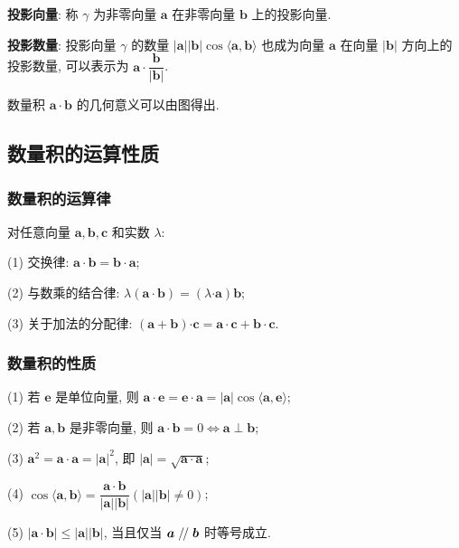 \documentclass[titlepage]{ctexart}
\renewcommand\parallel{\mathrel{/\mskip-2.5mu/}}
\begin{document}
\textbf{投影向量}: 称 $\gamma$ 为非零向量 $\boldsymbol{a}$ 在非零向量 $\boldsymbol{b}$ 上的投影向量.

\textbf{投影数量}: 投影向量 $\gamma$ 的数量 $|\boldsymbol{a}||\boldsymbol{b}|\cos \langle \boldsymbol{a}, \boldsymbol{b} \rangle$
也成为向量 $\boldsymbol{a}$ 在向量 $|\boldsymbol{b}|$ 方向上的投影数量, 可以表示为 $\boldsymbol{a \cdot} \dfrac{\boldsymbol{b}}{|\boldsymbol{b}|}$.

数量积 $\boldsymbol{a \cdot b}$ 的几何意义可以由图得出.

\subsection{数量积的运算性质}

\subsubsection{数量积的运算律}

对任意向量 $\boldsymbol{a, b, c}$ 和实数 $\lambda$:

(1) 交换律: $\boldsymbol{a \cdot b} = \boldsymbol{b \cdot a}$;

(2) 与数乘的结合律: $\lambda(\boldsymbol{a \cdot b}) = (\lambda \boldsymbol{\cdot a}) \boldsymbol{b}$;

(3) 关于加法的分配律: $(\boldsymbol{a} + \boldsymbol{b}) \boldsymbol{\cdot c} = \boldsymbol{a \cdot c} + \boldsymbol{b \cdot c}$.

\subsubsection{数量积的性质}

(1) 若 $\boldsymbol{e}$ 是单位向量, 则 $\boldsymbol{a \cdot e} = \boldsymbol{e \cdot a} = |\boldsymbol{a}|\cos \langle \boldsymbol{a, e} \rangle$;

(2) 若 $\boldsymbol{a, b}$ 是非零向量, 则 $\boldsymbol{a \cdot b} = 0 \Leftrightarrow \boldsymbol{a} \perp \boldsymbol{b}$;

(3) $\boldsymbol{a}^2 = \boldsymbol{a \cdot a} = |\boldsymbol{a}|^2$, 即 $|\boldsymbol{a}| = \sqrt{\boldsymbol{a \cdot a}}$;

(4) $\cos \langle \boldsymbol{a, b} \rangle = \dfrac{\boldsymbol{a \cdot b}}{|\boldsymbol{a}||\boldsymbol{b}|}(|\boldsymbol{a}||\boldsymbol{b}|\neq 0)$;

(5) $|\boldsymbol{a \cdot b}| \leq |\boldsymbol{a}||\boldsymbol{b}|$, 当且仅当 $\boldsymbol{a} \parallel \boldsymbol{b}$ 时等号成立.
\end{document}
